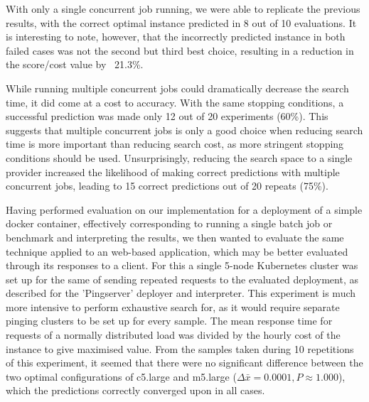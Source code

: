 \documentclass{article}
\begin{document}
With only a single concurrent job running, we were able to replicate the previous results, with the correct optimal instance predicted in 8 out of 10 evaluations. It is interesting to note, however, that the incorrectly predicted instance in both failed cases was not the second but third best choice, resulting in a reduction in the score/cost value by ~21.3\%.

While running multiple concurrent jobs could dramatically decrease the search time, it did come at a cost to accuracy. With the same stopping conditions, a successful prediction was made only 12 out of 20 experiments (60\%). This suggests that multiple concurrent jobs is only a good choice when reducing search time is more important than reducing search cost, as more stringent stopping conditions should be used.  Unsurprisingly, reducing the search space to a single provider increased the likelihood of making correct predictions with multiple concurrent jobs, leading to 15 correct predictions out of 20 repeats (75\%).

Having performed evaluation on our implementation for a deployment of a simple docker container, effectively corresponding to running a single batch job or benchmark and interpreting the results, we then wanted to evaluate the same technique applied to an web-based application, which may be better evaluated through its responses to a client. For this a single 5-node Kubernetes cluster was set up for the same of sending repeated requests to the evaluated deployment, as described for the 'Pingserver' deployer and interpreter. This experiment is much more intensive to perform exhaustive search for, as it would require separate pinging clusters to be set up for every sample. The mean response time for requests of a normally distributed load was divided by the hourly cost of the instance to give maximised value. From the samples taken during 10 repetitions of this experiment, it seemed that there were no significant difference between the two optimal configurations of c5.large and m5.large ($\Delta \bar{x}=0.0001, P \approx 1.000$), which the predictions correctly converged upon in all cases.
\end{document}
